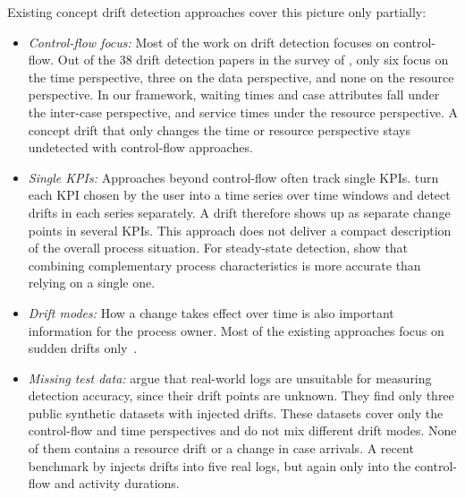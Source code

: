 Existing concept drift detection approaches cover this picture only partially:
\begin{itemize}
	\item \emph{Control-flow focus:} Most of the work on drift detection focuses on control-flow. Out of the 38 drift detection papers in the survey of \textcite{sato2022survey}, only six focus on the time perspective, three on the data perspective, and none on the resource perspective. In our framework, waiting times and case attributes fall under the inter-case perspective, and service times under the resource perspective. A concept drift that only changes the time or resource perspective stays undetected with control-flow approaches.
	\item \emph{Single KPIs:} Approaches beyond control-flow often track single KPIs. \textcite{adams2023explainable} turn each KPI chosen by the user into a time series over time windows and detect drifts in each series separately. A drift therefore shows up as separate change points in several KPIs. This approach does not deliver a compact description of the overall process situation. For steady-state detection, \textcite{kraus2026steady} show that combining complementary process characteristics is more accurate than relying on a single one.
	\item \emph{Drift modes:} How a change takes effect over time is also important information for the process owner. Most of the existing approaches focus on sudden drifts only~\autocite{sato2022survey}.
	\item \emph{Missing test data:} \textcite{sato2022survey} argue that real-world logs are unsuitable for measuring detection accuracy, since their drift points are unknown. They find only three public synthetic datasets with injected drifts. These datasets cover only the control-flow and time perspectives and do not mix different drift modes. None of them contains a resource drift or a change in case arrivals. A recent benchmark by \textcite{padella2026everything} injects drifts into five real logs, but again only into the control-flow and activity durations.
\end{itemize}

